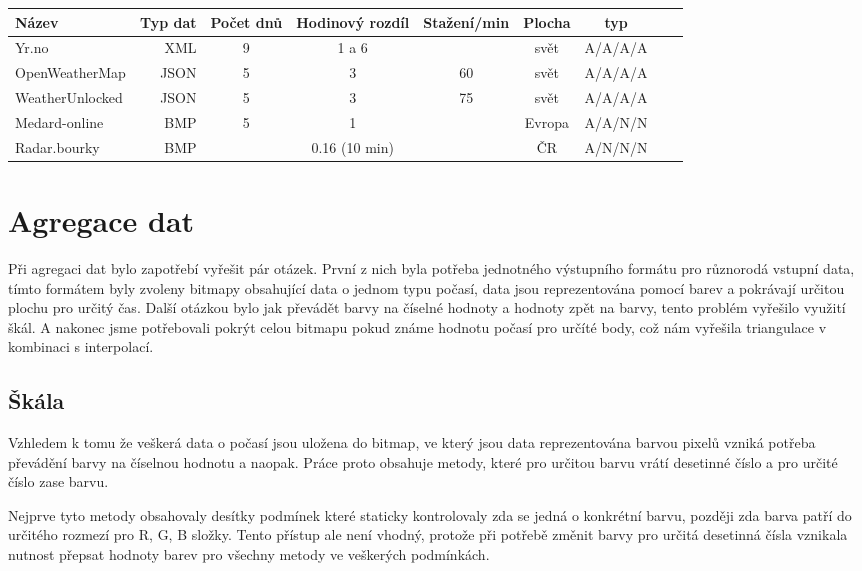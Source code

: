 \documentclass[czech,bachelor,dept460,male,csharp,cpdeclaration]{diploma}
\begin{document}
	\begin{center}
		\begin{tabular} {l r c c c c c c c}
			
			Název & Typ dat & Počet dnů & Hodinový rozdíl & Stažení/min & Plocha & typ \\
			\hline
			Yr.no & XML & 9 & 1 a 6 & & svět & A/A/A/A \\ 
			OpenWeatherMap & JSON & 5 & 3 & 60 & svět & A/A/A/A \\ 
			WeatherUnlocked & JSON & 5 & 3 & 75 & svět & A/A/A/A \\ 
			Medard-online & BMP & 5 & 1 &  & Evropa & A/A/N/N \\ 
			Radar.bourky & BMP & & 0.16 (10 min)& & ČR & A/N/N/N \\ 
			
		\end{tabular}
	\end{center}
	
	\chapter{Agregace dat}
	
	Při agregaci dat bylo zapotřebí vyřešit pár otázek. První z nich byla potřeba jednotného výstupního formátu pro různorodá vstupní data, tímto formátem byly zvoleny bitmapy obsahující data o jednom typu počasí, data jsou reprezentována pomocí barev a pokrávají určitou plochu pro určitý čas. Další otázkou bylo jak převádět barvy na číselné hodnoty a hodnoty zpět na barvy, tento problém vyřešilo využití škál. A nakonec jsme potřebovali pokrýt celou bitmapu pokud známe hodnotu počasí pro určíté body, což nám vyřešila triangulace v kombinaci s interpolací.
	
	\section{Škála}
	
	Vzhledem k tomu že veškerá data o počasí jsou uložena do bitmap, ve který jsou data reprezentována barvou pixelů vzniká potřeba převádění barvy na číselnou hodnotu a naopak. Práce proto obsahuje metody, které pro určitou barvu vrátí desetinné číslo a pro určité číslo zase barvu.
	
	Nejprve tyto metody obsahovaly desítky podmínek které staticky kontrolovaly zda se jedná o konkrétní barvu, později zda barva patří do určitého rozmezí pro R, G, B složky. Tento přístup ale není vhodný, protože při potřebě změnit barvy pro určitá desetinná čísla vznikala nutnost přepsat hodnoty barev pro všechny metody ve veškerých podmínkách.
	
\end{document}
